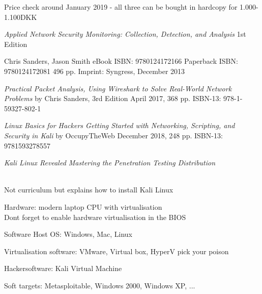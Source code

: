 \documentclass[Screen16to9,17pt]{foils}
\begin{document}
Price check around January 2019 - all three can be bought in hardcopy for 1.000-1.100DKK



\emph{Applied Network Security Monitoring: Collection, Detection, and Analysis}
1st Edition

Chris Sanders, Jason Smith
eBook ISBN: 9780124172166
Paperback ISBN: 9780124172081 496 pp.
Imprint: Syngress, December 2013

{\footnotesize{}}


\emph{Practical Packet Analysis,
Using Wireshark to Solve Real-World Network Problems}
by Chris Sanders, 3rd Edition
April 2017, 368 pp.
ISBN-13:
978-1-59327-802-1




\emph{Linux Basics for Hackers
Getting Started with Networking, Scripting, and Security in Kali}
by OccupyTheWeb
December 2018, 248 pp.
ISBN-13:
9781593278557





\emph{Kali Linux Revealed  Mastering the Penetration Testing Distribution}

\\
Not curriculum but explains how to install Kali Linux







\begin{list2}
\item Hardware: modern laptop CPU with virtualisation\\
Dont forget to enable hardware virtualisation in the BIOS
\item Software Host OS: Windows, Mac, Linux
\item Virtualisation software: VMware, Virtual box, HyperV pick your poison
\item Hackersoftware: Kali Virtual Machine 
\item Soft targets: Metasploitable, Windows 2000, Windows XP, ...
\end{list2}
\end{document}
